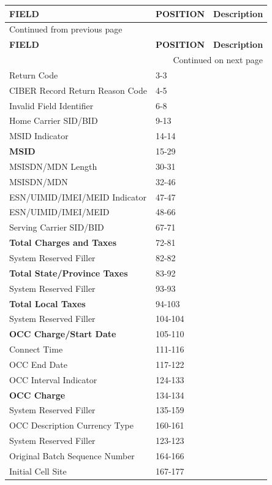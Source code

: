 \documentclass[12pt,twoside]{article}
\begin{document}
\begin{longtable}{l|l|l}
\hline
\textbf{FIELD} & \textbf{POSITION} & \textbf{Description}\\
\hline
\endfirsthead
\multicolumn{3}{l}{Continued from previous page} \\
\hline

\textbf{FIELD} & \textbf{POSITION} & \textbf{Description} \\

\hline
\endhead
\hline\multicolumn{3}{r}{Continued on next page} \\
\endfoot
\endlastfoot
\hline
Return Code & 3-3 & \\
CIBER Record Return Reason Code & 4-5 & \\
Invalid Field Identifier & 6-8 & \\
Home Carrier SID/BID & 9-13 & \\
MSID Indicator & 14-14 & \\
\textbf{MSID} & 15-29 & \\
MSISDN/MDN Length & 30-31 & \\
MSISDN/MDN & 32-46 & \\
ESN/UIMID/IMEI/MEID Indicator & 47-47 & \\
ESN/UIMID/IMEI/MEID & 48-66 & \\
Serving Carrier SID/BID & 67-71 & \\
\textbf{Total Charges and Taxes} & 72-81 & \\
System Reserved Filler & 82-82 & \\
\textbf{Total State/Province Taxes} & 83-92 & \\
System Reserved Filler & 93-93 & \\
\textbf{Total Local Taxes} & 94-103 & \\
System Reserved Filler & 104-104 & \\
\textbf{OCC Charge/Start Date} & 105-110 & \\
Connect Time & 111-116 & \\
OCC End Date & 117-122 & \\
OCC Interval Indicator & 124-133 & \\
\textbf{OCC Charge} & 134-134 & \\
System Reserved Filler & 135-159 & \\
OCC Description Currency Type & 160-161 & \\
System Reserved Filler & 123-123 & \\
Original Batch Sequence Number & 164-166 & \\
Initial Cell Site & 167-177 & \\

\end{longtable}
\end{document}
